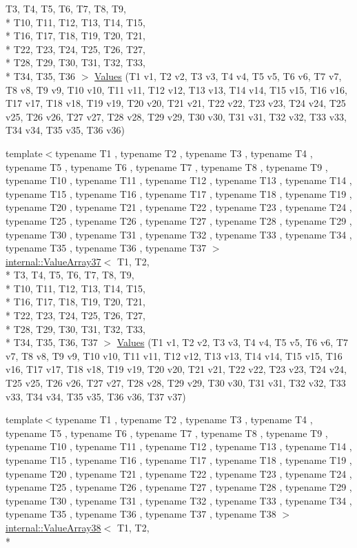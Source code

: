\begin{DoxyCompactItemize}
T3, T4, T5, T6, T7, T8, T9, \\*
T10, T11, T12, T13, T14, T15, \\*
T16, T17, T18, T19, T20, T21, \\*
T22, T23, T24, T25, T26, T27, \\*
T28, T29, T30, T31, T32, T33, \\*
T34, T35, T36 $>$ \hyperlink{namespacetesting_ae5d25537f4919c9e82d02c45af4c7c5f}{Values} (T1 v1, T2 v2, T3 v3, T4 v4, T5 v5, T6 v6, T7 v7, T8 v8, T9 v9, T10 v10, T11 v11, T12 v12, T13 v13, T14 v14, T15 v15, T16 v16, T17 v17, T18 v18, T19 v19, T20 v20, T21 v21, T22 v22, T23 v23, T24 v24, T25 v25, T26 v26, T27 v27, T28 v28, T29 v29, T30 v30, T31 v31, T32 v32, T33 v33, T34 v34, T35 v35, T36 v36)
\item 
{\footnotesize template$<$typename T1 , typename T2 , typename T3 , typename T4 , typename T5 , typename T6 , typename T7 , typename T8 , typename T9 , typename T10 , typename T11 , typename T12 , typename T13 , typename T14 , typename T15 , typename T16 , typename T17 , typename T18 , typename T19 , typename T20 , typename T21 , typename T22 , typename T23 , typename T24 , typename T25 , typename T26 , typename T27 , typename T28 , typename T29 , typename T30 , typename T31 , typename T32 , typename T33 , typename T34 , typename T35 , typename T36 , typename T37 $>$ }\\\hyperlink{classtesting_1_1internal_1_1ValueArray37}{internal\-::\-Value\-Array37}$<$ T1, T2, \\*
T3, T4, T5, T6, T7, T8, T9, \\*
T10, T11, T12, T13, T14, T15, \\*
T16, T17, T18, T19, T20, T21, \\*
T22, T23, T24, T25, T26, T27, \\*
T28, T29, T30, T31, T32, T33, \\*
T34, T35, T36, T37 $>$ \hyperlink{namespacetesting_aa800bbbe42a44b1776cfd61c9e337ab6}{Values} (T1 v1, T2 v2, T3 v3, T4 v4, T5 v5, T6 v6, T7 v7, T8 v8, T9 v9, T10 v10, T11 v11, T12 v12, T13 v13, T14 v14, T15 v15, T16 v16, T17 v17, T18 v18, T19 v19, T20 v20, T21 v21, T22 v22, T23 v23, T24 v24, T25 v25, T26 v26, T27 v27, T28 v28, T29 v29, T30 v30, T31 v31, T32 v32, T33 v33, T34 v34, T35 v35, T36 v36, T37 v37)
\item 
{\footnotesize template$<$typename T1 , typename T2 , typename T3 , typename T4 , typename T5 , typename T6 , typename T7 , typename T8 , typename T9 , typename T10 , typename T11 , typename T12 , typename T13 , typename T14 , typename T15 , typename T16 , typename T17 , typename T18 , typename T19 , typename T20 , typename T21 , typename T22 , typename T23 , typename T24 , typename T25 , typename T26 , typename T27 , typename T28 , typename T29 , typename T30 , typename T31 , typename T32 , typename T33 , typename T34 , typename T35 , typename T36 , typename T37 , typename T38 $>$ }\\\hyperlink{classtesting_1_1internal_1_1ValueArray38}{internal\-::\-Value\-Array38}$<$ T1, T2, \\*

\end{DoxyCompactItemize}
